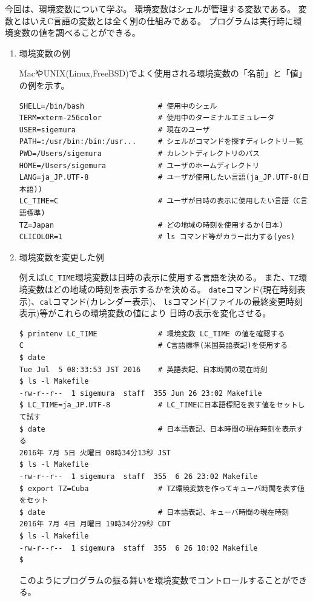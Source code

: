 \documentclass[a4j,dvipdfmx]{jarticle}
\begin{document}
\def\lstlistingname{リスト}


今回は、環境変数について学ぶ。
環境変数はシェルが管理する変数である。
変数とはいえC言語の変数とは全く別の仕組みである。
プログラムは実行時に環境変数の値を調べることができる。

\begin{enumerate}
\item 環境変数の例

MacやUNIX(Linux,FreeBSD)でよく使用される環境変数の「名前」と「値」の例を示す。
\begin{lstlisting}[numbers=none]
SHELL=/bin/bash                 # 使用中のシェル
TERM=xterm-256color             # 使用中のターミナルエミュレータ
USER=sigemura                   # 現在のユーザ
PATH=:/usr/bin:/bin:/usr...     # シェルがコマンドを探すディレクトリ一覧
PWD=/Users/sigemura             # カレントディレクトリのパス
HOME=/Users/sigemura            # ユーザのホームディレクトリ
LANG=ja_JP.UTF-8                # ユーザが使用したい言語(ja_JP.UTF-8(日本語))
LC_TIME=C                       # ユーザが日時の表示に使用したい言語（C言語標準)
TZ=Japan                        # どの地域の時刻を使用するか(日本)
CLICOLOR=1                      # ls コマンド等がカラー出力する(yes)
\end{lstlisting}

\item 環境変数を変更した例

例えば\verb/LC_TIME/環境変数は日時の表示に使用する言語を決める。
また、\verb/TZ/環境変数はどの地域の時刻を表示するかを決める。
\verb/date/コマンド(現在時刻表示)、\verb/cal/コマンド(カレンダー表示)、
\verb/ls/コマンド(ファイルの最終変更時刻表示)等がこれらの環境変数の値により
日時の表示を変化させる。
\begin{lstlisting}[numbers=none]
$ printenv LC_TIME              # 環境変数 LC_TIME の値を確認する
C                               # C言語標準(米国英語表記)を使用する
$ date
Tue Jul  5 08:33:53 JST 2016    # 英語表記、日本時間の現在時刻
$ ls -l Makefile 
-rw-r--r--  1 sigemura  staff  355 Jun 26 23:02 Makefile
$ LC_TIME=ja_JP.UTF-8           # LC_TIMEに日本語標記を表す値をセットして試す
$ date                          # 日本語表記、日本時間の現在時刻を表示する
2016年 7月 5日 火曜日 08時34分13秒 JST
$ ls -l Makefile 
-rw-r--r--  1 sigemura  staff  355  6 26 23:02 Makefile
$ export TZ=Cuba                # TZ環境変数を作ってキューバ時間を表す値をセット
$ date                          # 日本語表記、キューバ時間の現在時刻
2016年 7月 4日 月曜日 19時34分29秒 CDT
$ ls -l Makefile 
-rw-r--r--  1 sigemura  staff  355  6 26 10:02 Makefile
$
\end{lstlisting}
このようにプログラムの振る舞いを環境変数でコントロールすることができる。


\end{enumerate}
\end{document}
